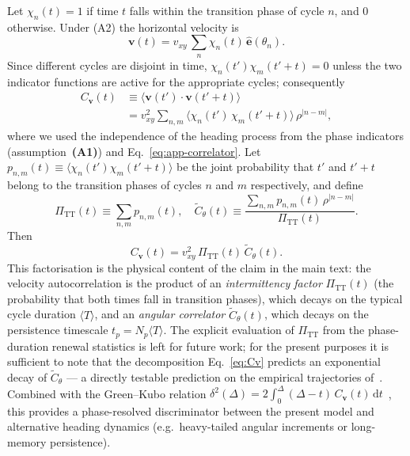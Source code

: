 \documentclass[11pt,a4paper]{article}
\begin{document}
Let $\chi_n(t) = 1$ if time $t$ falls within the transition phase
of cycle $n$, and $0$ otherwise. Under (A2) the horizontal velocity
is
\begin{equation}
\mathbf{v}(t) = v_{xy}\,\sum_n \chi_n(t)\,\hat{\mathbf{e}}(\theta_n).
\end{equation}
Since different cycles are disjoint in time, $\chi_n(t')\chi_m(t'+t)
= 0$ unless the two indicator functions are active for the
appropriate cycles; consequently
\begin{align}
C_{\mathbf{v}}(t) &\equiv \langle \mathbf{v}(t')\cdot\mathbf{v}(t'+t)\rangle \nonumber\\
 &= v_{xy}^2\sum_{n,m}\langle \chi_n(t')\,\chi_m(t'+t)\rangle\,
  \rho^{|n-m|},
\end{align}
where we used the independence of the heading process from the
phase indicators (assumption~\textbf{(A1)}) and
Eq.~\eqref{eq:app-correlator}. Let
$p_{n,m}(t) \equiv \langle\chi_n(t')\chi_m(t'+t)\rangle$ be the
joint probability that $t'$ and $t'+t$ belong to the transition
phases of cycles $n$ and $m$ respectively, and define
\begin{equation}
\Pi_{\mathrm{TT}}(t) \equiv \sum_{n,m} p_{n,m}(t),\quad
\widetilde{C}_\theta(t) \equiv \frac{\sum_{n,m} p_{n,m}(t)\,\rho^{|n-m|}}
                                    {\Pi_{\mathrm{TT}}(t)}.
\end{equation}
Then
\begin{equation}
C_{\mathbf{v}}(t) = v_{xy}^2\,\Pi_{\mathrm{TT}}(t)\,
 \widetilde{C}_\theta(t).
\label{eq:Cv}
\end{equation}
This factorisation is the physical content of the claim in the
main text: the velocity autocorrelation is the product of an
\emph{intermittency factor} $\Pi_{\mathrm{TT}}(t)$ (the probability
that both times fall in transition phases), which decays on the
typical cycle duration $\langle T\rangle$, and an
\emph{angular correlator} $\widetilde{C}_\theta(t)$, which decays
on the persistence timescale $t_p = N_p\langle T\rangle$. The
explicit evaluation of $\Pi_{\mathrm{TT}}$ from the phase-duration
renewal statistics is left for future work; for the present
purposes it is sufficient to note that the decomposition
Eq.~\eqref{eq:Cv} predicts an exponential decay of
$\widetilde{C}_\theta$ --- a directly testable prediction on the
empirical trajectories of~\cite{vilpellet2026}. Combined with
the Green--Kubo relation $\delta^2(\Delta) = 2\int_0^\Delta
(\Delta-t)\,C_{\mathbf{v}}(t)\,\mathrm{d}t$~\cite{kubo1985}, this
provides a phase-resolved discriminator between the present model
and alternative heading dynamics (e.g.\ heavy-tailed angular
increments or long-memory persistence).
\end{document}

